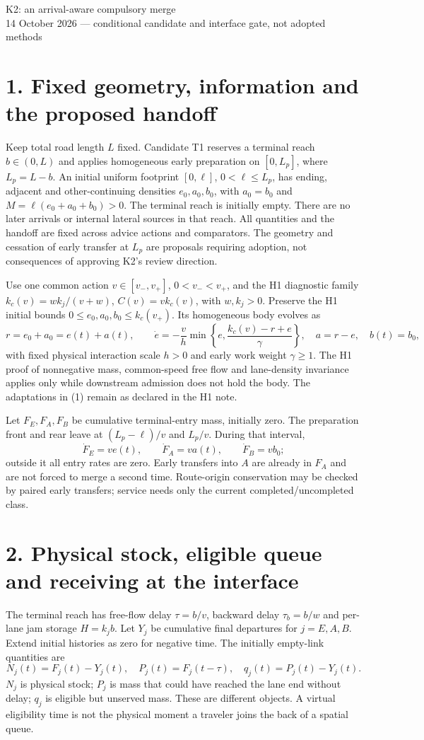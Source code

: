 \documentclass[11pt,a4paper]{article}
\begin{document}
\begin{center}
{\Large K2: an arrival-aware compulsory merge}\\[4pt]
14 October 2026 --- conditional candidate and interface gate, not adopted methods
\end{center}

\section*{1. Fixed geometry, information and the proposed handoff}
Keep total road length $L$ fixed. Candidate T1 reserves a terminal reach
$b\in(0,L)$ and applies homogeneous early preparation on $[0,L_p]$, where
$L_p=L-b$. An initial uniform footprint $[0,\ell]$, $0<\ell\leq L_p$, has
ending, adjacent and other-continuing densities $e_0,a_0,b_0$, with
$a_0=b_0$ and $M=\ell(e_0+a_0+b_0)>0$. The terminal reach is initially empty.
There are no later arrivals or internal lateral sources in that reach.
All quantities and the handoff are fixed across advice actions and comparators.
The geometry and cessation of early transfer at $L_p$ are proposals requiring
adoption, not consequences of approving K2's review direction.

Use one common action $v\in[v_-,v_+]$, $0<v_-<v_+$, and the H1 diagnostic
family $k_c(v)=wk_j/(v+w)$, $C(v)=vk_c(v)$, with $w,k_j>0$. Preserve the H1
initial bounds $0\leq e_0,a_0,b_0\leq k_c(v_+)$. Its homogeneous body evolves as
\[
 r=e_0+a_0=e(t)+a(t),\qquad
 \dot e=-\frac{v}{h}\min\left\{e,\frac{k_c(v)-r+e}{\gamma}\right\},
 \quad a=r-e,\quad b(t)=b_0,
 \tag{1}
\]
with fixed physical interaction scale $h>0$ and early work weight $\gamma\geq1$.
The H1 proof of nonnegative mass, common-speed free flow and lane-density
invariance applies only while downstream admission does not hold the body.
The adaptations in (1) remain as declared in the H1 note.

Let $F_E,F_A,F_B$ be cumulative terminal-entry mass, initially zero. The
preparation front and rear leave at $(L_p-\ell)/v$ and $L_p/v$. During that
interval,
\[
 \dot F_E=ve(t),\qquad \dot F_A=va(t),\qquad \dot F_B=vb_0;
 \tag{2}
\]
outside it all entry rates are zero. Early transfers into $A$ are already in
$F_A$ and are not forced to merge a second time. Route-origin conservation
may be checked by paired early transfers; service needs only the current
completed/uncompleted class.

\section*{2. Physical stock, eligible queue and receiving at the interface}
The terminal reach has free-flow delay $\tau=b/v$, backward delay
$\tau_b=b/w$ and per-lane jam storage $H=k_jb$. Let $Y_j$ be cumulative final
departures for $j=E,A,B$. Extend initial histories as zero for negative time.
The initially empty-link quantities are
\[
 N_j(t)=F_j(t)-Y_j(t),\quad
 P_j(t)=F_j(t-\tau),\quad
 q_j(t)=P_j(t)-Y_j(t).
 \tag{3}
\]
$N_j$ is physical stock; $P_j$ is mass that could have reached the lane end
without delay; $q_j$ is eligible but unserved mass. These are different
objects. A virtual eligibility time is not the physical moment a traveler
joins the back of a spatial queue.
\end{document}
